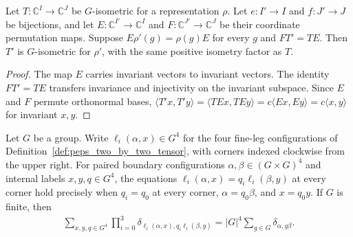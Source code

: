 
\begin{lemma}%
    \label{thm:peps_g_isometry_coordinate_equiv}
    \leanok
    Let $T:\mathbb C^I\to\mathbb C^J$ be $G$-isometric for a
    representation $\rho$. Let $e:I'\to I$ and $f:J'\to J$ be bijections,
    and let $E:\mathbb C^{I'}\to\mathbb C^I$ and
    $F:\mathbb C^{J'}\to\mathbb C^J$ be their coordinate permutation
    maps. Suppose $E\rho'(g)=\rho(g)E$ for every $g$ and $FT'=TE$.
    Then $T'$ is $G$-isometric for $\rho'$, with the same positive
    isometry factor as $T$.
\end{lemma}

\begin{proof}\leanok
    The map $E$ carries invariant vectors to invariant vectors.
    The identity $FT'=TE$ transfers invariance and injectivity on the
    invariant subspace. Since $E$ and $F$ permute orthonormal bases,
    $\langle T'x,T'y\rangle=\langle TEx,TEy\rangle
        =c\langle Ex,Ey\rangle=c\langle x,y\rangle$ for invariant $x,y$.
\end{proof}

\begin{lemma}%
    \label{thm:peps_two_by_two_translation_compatibility}
    \leanok
    Let $G$ be a group. Write $\ell_i(\alpha,x)\in G^4$ for the
    four fine-leg configurations of Definition~\ref{def:peps_two_by_two_tensor},
    with corners indexed clockwise from the upper right. For paired boundary
    configurations $\alpha,\beta\in(G\times G)^4$ and internal labels
    $x,y,q\in G^4$, the equations
    $\ell_i(\alpha,x)=q_i\ell_i(\beta,y)$ at every corner hold precisely
    when $q_i=q_0$ at every corner, $\alpha=q_0\beta$, and $x=q_0y$.
    If $G$ is finite, then
    \begin{align}
        \sum_{x,y,q\in G^4}
        \prod_{i=0}^3\delta_{\ell_i(\alpha,x),q_i\ell_i(\beta,y)}
        =|G|^4\sum_{g\in G}\delta_{\alpha,g\beta}.
    \end{align}
\end{lemma}

